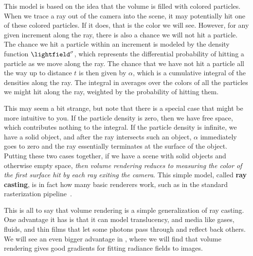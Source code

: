 This model is based on the idea that the volume is filled with colored particles. When we trace a ray out of the camera into the scene, it may potentially hit one of these colored particles.
If it does, that is the color we will see. However, for any given increment along the ray, there is also a chance we will not hit a particle. The chance we hit a particle within an
increment is modeled by the density function $\lightfield^\sigma$, which represents the differential probability of hitting a particle as we move along the ray.
The chance that we have not hit a particle all the way up to distance $t$ is then given by $\alpha$, which is a cumulative integral of the densities along the ray.
The integral in \eqn{\ref{eqn:nerfs:vol_rendering_integral}} averages over the colors of all the particles we might hit along the ray,
weighted by the probability of hitting them.

This may seem a bit strange, but note that there is a special case that might be more intuitive to you. If the particle density is zero, then we have free space,
which contributes nothing to the integral. If the particle density is infinite, we have a solid object, and after the ray intersects such an object, $\alpha$
immediately goes to zero and the ray essentially terminates at the surface of the object. Putting these two cases together, if we have a scene with solid objects
and otherwise empty space, \textit{then volume rendering reduces to measuring the color of the first surface hit by each ray exiting the camera}.
This simple model, called \textbf{ray casting}, is in fact how many basic renderers work, such as in the standard rasterization pipeline~\cite{shirley2009fundamentals}.

This is all to say that volume rendering is a simple generalization of ray casting. One advantage it has is that it can model translucency, and media like gases, fluids,
and thin films that let some photons pass through and reflect back others. We will see an even bigger advantage in \sect{\ref{sec:nerfs:fitting}}, where we will find that
volume rendering gives good gradients for fitting radiance fields to images.

